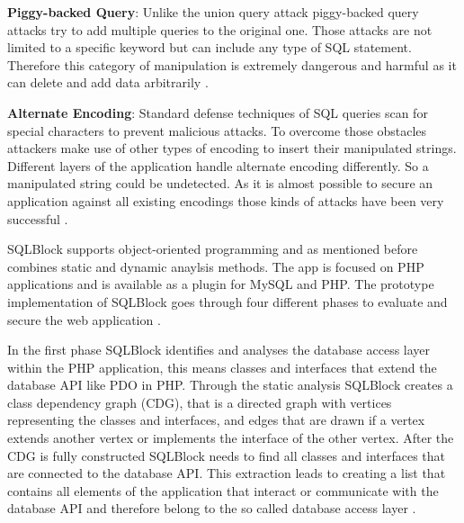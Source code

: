 \textbf{Piggy-backed Query}: Unlike the union query attack piggy-backed query attacks try to add multiple queries to the original one. Those attacks are not limited to a specific keyword but can include any type of SQL statement. Therefore this category of manipulation is extremely dangerous and harmful as it can delete and add data arbitrarily \autocite[4]{Halfond2008}.\newline


\textbf{Alternate Encoding}: Standard defense techniques of SQL queries scan for special characters to prevent malicious attacks. To overcome those obstacles attackers make use of other types of encoding to insert their manipulated strings. Different layers of the application handle alternate encoding differently. So a manipulated string could be undetected. As it is almost possible to secure an application against all existing encodings those kinds of attacks have been very successful \autocite[5]{Halfond2008}.\newline

SQLBlock supports object-oriented programming and as mentioned before combines static and dynamic anaylsis methods. The app is focused on PHP applications and is available as a plugin for MySQL and PHP. The prototype implementation of SQLBlock goes through four different phases to evaluate and secure the web application \autocite[1, 5]{Jahanshahi2018}.\newline


In the first phase SQLBlock identifies and analyses the database access layer within the PHP application, this means classes and interfaces that extend the database API like PDO in PHP. Through the static analysis SQLBlock creates a class dependency graph (CDG), that is a directed graph with vertices representing the classes and interfaces, and edges that are drawn if a vertex extends another vertex or implements the interface of the other vertex. After the CDG is fully constructed SQLBlock needs to find all classes and interfaces that are connected to the database API. This extraction leads to creating a list that contains all elements of the application that interact or communicate with the database API and therefore belong to the so called database access layer \autocite[3, 6]{Jahanshahi2018}.\newline


